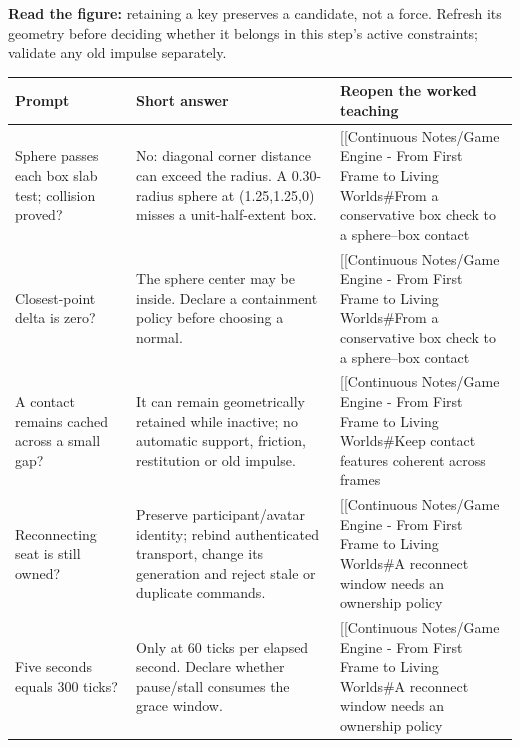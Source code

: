 
\textbf{Read the figure:} retaining a key preserves a candidate, not a force. Refresh its geometry before deciding whether it belongs in this step's active constraints; validate any old impulse separately.

{\def\LTcaptype{none} %
\begin{longtable}[]{@{}
  >{\raggedright\arraybackslash}p{}
  >{\raggedright\arraybackslash}p{}
  >{\raggedright\arraybackslash}p{}@{}}
\toprule\noalign{}
\begin{minipage}[b]{\linewidth}\raggedright
Prompt
\end{minipage} & \begin{minipage}[b]{\linewidth}\raggedright
Short answer
\end{minipage} & \begin{minipage}[b]{\linewidth}\raggedright
Reopen the worked teaching
\end{minipage} \\
\midrule\noalign{}
\endhead
\bottomrule\noalign{}
\endlastfoot
Sphere passes each box slab test; collision proved? & No: diagonal corner distance can exceed the radius. A 0.30-radius sphere at (1.25,1.25,0) misses a unit-half-extent box. & {[}{[}Continuous Notes/Game Engine - From First Frame to Living Worlds\#From a conservative box check to a sphere--box contact \\
Closest-point delta is zero? & The sphere center may be inside. Declare a containment policy before choosing a normal. & {[}{[}Continuous Notes/Game Engine - From First Frame to Living Worlds\#From a conservative box check to a sphere--box contact \\
A contact remains cached across a small gap? & It can remain geometrically retained while inactive; no automatic support, friction, restitution or old impulse. & {[}{[}Continuous Notes/Game Engine - From First Frame to Living Worlds\#Keep contact features coherent across frames \\
Reconnecting seat is still owned? & Preserve participant/avatar identity; rebind authenticated transport, change its generation and reject stale or duplicate commands. & {[}{[}Continuous Notes/Game Engine - From First Frame to Living Worlds\#A reconnect window needs an ownership policy \\
Five seconds equals 300 ticks? & Only at 60 ticks per elapsed second. Declare whether pause/stall consumes the grace window. & {[}{[}Continuous Notes/Game Engine - From First Frame to Living Worlds\#A reconnect window needs an ownership policy \\
\end{longtable}
}

